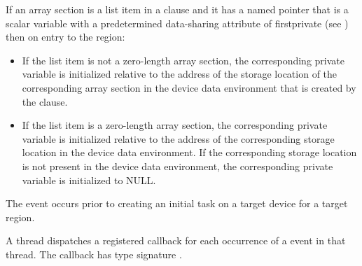 \begin{ccppspecific}

If an array section is a list item in a  clause and it has a named
pointer that is a scalar variable with a predetermined data-sharing attribute
of firstprivate (see ) then on entry to the 
region:

\begin{itemize}
\item If the list item is not a zero-length array section, the corresponding
private variable is initialized relative to the address of the storage
location of the corresponding array section in the device data environment
that is created by the  clause.

\item If the list item is a zero-length array section, the corresponding
private variable is initialized relative to the address of the
corresponding storage location in the device data environment. If the
corresponding storage location is not present in the device data environment,
the corresponding private variable is initialized to NULL.
\end{itemize}

\end{ccppspecific}


\events
{}

The  event occurs prior to creating an initial task on a target device for a target
region.

\tools
{}

A thread dispatches a registered 
callback for each occurrence of a  event
in that thread. The callback has type signature
.

